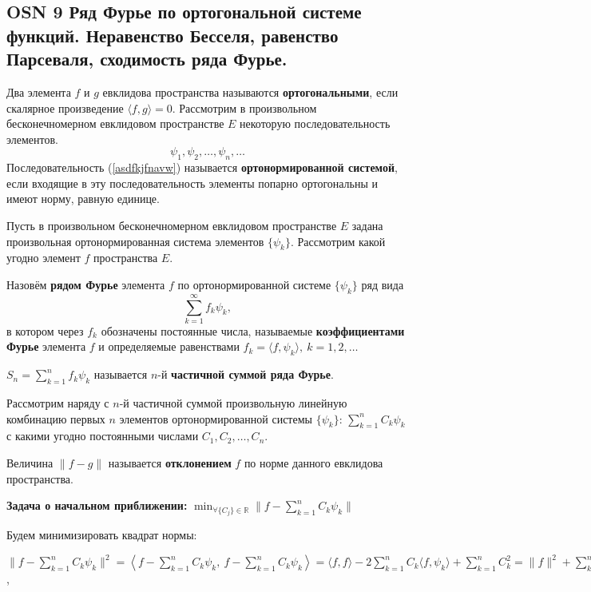 \subsection{OSN 9 Ряд Фурье по ортогональной системе функций. Неравенство Бесселя, равенство Парсеваля,  сходимость ряда Фурье.}

Два элемента $f$ и $g$ евклидова пространства называются \textbf{ортогональными}, если скалярное произведение $\langle f, g \rangle = 0$.
Рассмотрим в произвольном бесконечномерном евклидовом пространстве $E$ некоторую последовательность элементов.
\begin{equation}
    \psi_1, \psi_2, \dots, \psi_n, \dots
    \label{asdfkjfnavw}
\end{equation}
Последовательность (\ref{asdfkjfnavw}) называется \textbf{ортонормированной системой}, если входящие в эту последовательность элементы попарно ортогональны и имеют норму, равную единице.

Пусть в произвольном бесконечномерном евклидовом пространстве $E$ задана произвольная ортонормированная система элементов $\{\psi_k\}$. Рассмотрим какой угодно элемент $f$ пространства $E$.

Назовём \textbf{рядом Фурье} элемента $f$ по ортонормированной системе $\{\psi_k\}$ ряд вида
$$\displaystyle\sum_{k=1}^{\infty} f_k\psi_k,$$
в котором через $f_k$ обозначены постоянные числа, называемые \textbf{коэффициентами Фурье} элемента $f$ и определяемые равенствами $f_k =\langle f,\psi_k\rangle, ~ k=1,2,\dots$

$S_n =\displaystyle\sum_{k=1}^{n}f_k\psi_k$ называется $n$-й \textbf{частичной суммой ряда Фурье}.

Рассмотрим наряду с $n$-й частичной суммой произвольную линейную комбинацию первых $n$ элементов ортонормированной системы $\{\psi_k\}$: $\displaystyle\sum_{k=1}^{n}C_k\psi_k$ с какими угодно постоянными числами $C_1, C_2, \dots, C_n$.

Величина $ \| f-g \|$ называется \textbf{отклонением} $f$ по норме данного евклидова пространства.

\textbf{Задача о начальном приближении:} $\displaystyle\min_{\forall\{C_j\}\in\mathbb{R}}  \|f-\displaystyle\sum_{k=1}^{n}C_k\psi_k \|$

Будем минимизировать квадрат нормы:

$ \| f-\displaystyle\sum_{k=1}^{n}C_k\psi_k \|^2 =  
\left\langle f-\displaystyle\sum_{k=1}^{n}C_k\psi_k, ~ f-\displaystyle\sum_{k=1}^{n}C_k\psi_k \right\rangle = 
\langle f, f \rangle - 2\displaystyle\sum_{k=1}^{n}C_k\langle f, \psi_k \rangle + \displaystyle\sum_{k=1}^{n} C_k^2 = 
\| f\|^2 + \displaystyle\sum_{k=1}^{n}(C_k^2-2C_kf_k) = 
\left\{ \pm \displaystyle\sum_{k=1}^{n}f_k^2 \right\} = 
\| f\|^2 - \displaystyle\sum_{k=1}^{n}f_k^2 + \displaystyle\sum_{k=1}^{n}(C_k-f_k)^2$,

